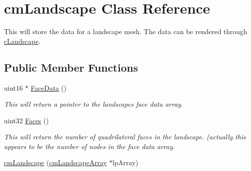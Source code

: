 \hypertarget{classcm_landscape}{
\section{cmLandscape Class Reference}
\label{classcm_landscape}
}


This will store the data for a landscape mesh. The data can be rendered through \hyperlink{classc_landscape}{cLandscape}.  


\subsection*{Public Member Functions}
\begin{DoxyCompactItemize}
\item 
\hypertarget{classcm_landscape_a559d50ea2cd594a12b87f556990043df}{
uint16 $\ast$ \hyperlink{classcm_landscape_a559d50ea2cd594a12b87f556990043df}{FaceData} ()}
\label{classcm_landscape_a559d50ea2cd594a12b87f556990043df}

\begin{DoxyCompactList}\small\item\em This will return a pointer to the landscapes face data array. \end{DoxyCompactList}\item 
\hypertarget{classcm_landscape_adb8e0e4968124d0ddae602ab5a51c147}{
uint32 \hyperlink{classcm_landscape_adb8e0e4968124d0ddae602ab5a51c147}{Faces} ()}
\label{classcm_landscape_adb8e0e4968124d0ddae602ab5a51c147}

\begin{DoxyCompactList}\small\item\em This will return the number of quadrilateral faces in the landscape. (actually this appears to be the number of nodes in the face data array. \end{DoxyCompactList}\item 
\hypertarget{classcm_landscape_a5d46433c68a7a1076ad738a5f0d28dc0}{
\hyperlink{classcm_landscape_a5d46433c68a7a1076ad738a5f0d28dc0}{cmLandscape} (\hyperlink{classcm_landscape_array}{cmLandscapeArray} $\ast$lpArray)}
\label{classcm_landscape_a5d46433c68a7a1076ad738a5f0d28dc0}


\end{DoxyCompactItemize}
